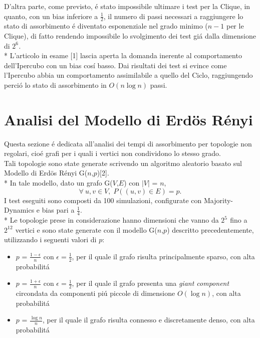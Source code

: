 \documentclass[../Tesi.tex]{subfiles}
\begin{document}
D'altra parte, come previsto, \'e stato impossibile ultimare i test per la Clique, in quanto, con un bias inferiore a $\frac{1}{2}$, il numero di passi necessari a raggiungere lo stato di assorbimento \'e diventato esponenziale nel grado minimo ($n-1$ per le Clique), di fatto rendendo impossibile lo svolgimento dei test gi\'a dalla dimensione di $2^{6^{\mathrm{}}}$.\\*
L'articolo in esame [1] lascia aperta la domanda inerente al comportamento dell'Ipercubo con un bias cos\'i basso. Dai risultati dei test si evince come l'Ipercubo abbia un comportamento assimilabile a quello del Ciclo, raggiungendo perci\'o lo stato di assorbimento in $O(n\log{}n)$ passi.
\section{Analisi del Modello di Erd{\"o}s R\'enyi}
Questa sezione \'e dedicata all'analisi dei tempi di assorbimento per topologie non regolari, cio\'e grafi per i quali i vertici non condividono lo stesso grado.\\
Tali topologie sono state generate scrivendo un algoritmo aleatorio basato sul Modello di Erd{\"o}s R\'enyi G($n$,$p$)[2].\\*
In tale modello, dato un grafo G($V$,$E$) con $|V|$ = $n$,
\begin{equation}
    \forall \: u,v \in V,\; P((u,v) \in E)=p.
\end{equation}
I test eseguiti sono composti da 100 simulazioni, configurate con Majority-Dynamics e bias pari a $\frac{1}{4}$.\\*
Le topologie prese in considerazione hanno dimensioni che vanno da $2^{5^{\mathrm{}}}$ fino a $2^{12^{\mathrm{}}}$ vertici e sono state generate con il modello G($n$,$p$) descritto precedentemente, utilizzando i seguenti valori di $p$:
\begin{itemize}
\item $p$ = $\frac{1-\epsilon}{n}$ con $\epsilon=\frac{1}{2}$, per il quale il grafo risulta principalmente sparso, con alta probabilit\'a
\item $p$ = $\frac{1+\epsilon}{n}$ con $\epsilon=\frac{1}{2}$, per il quale il grafo presenta una \emph{giant component} circondata da componenti pi\'u piccole di dimensione $O(\log{}n)$, con alta probabilit\'a
\item $p$ = $\frac{\log{}n}{n}$, per il quale il grafo risulta connesso e discretamente denso, con alta probabilit\'a
\end{itemize}
\end{document}
